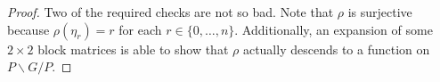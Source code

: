 \begin{proof}
    Two of the required checks are not so bad. Note that $\rho$ is surjective because $\rho(\eta_r)=r$ for each $r\in\{0,\ldots,n\}$. Additionally, an expansion of some $2\times2$ block matrices is able to show that $\rho$ actually descends to a function on $P\backslash G/P$.


\end{proof}
